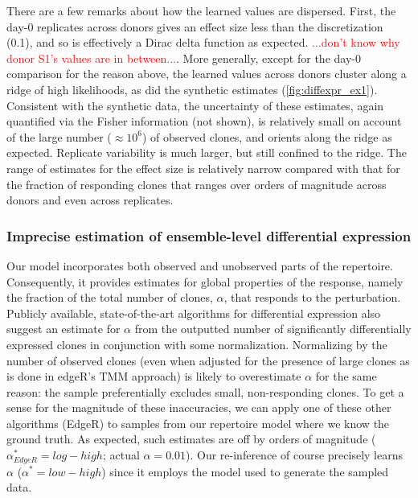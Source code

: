 \documentclass[letterpaper,english,prl,reprint,longbibliography]{revtex4-1} %
\newcommand{\re}[1]{\textcolor{red}{#1}}
\begin{document}
There are a few remarks about how the learned values are dispersed. First, the day-0 replicates across donors gives an effect size less than the discretization (0.1), and so is effectively a Dirac delta function as expected. \re{...don't know why donor S1's values are in between...}. More generally, except for the day-0 comparison for the reason above, the learned values across donors cluster along a ridge of high likelihoods, as did the synthetic estimates (\cref{fig:diffexpr_ex1}). Consistent with the synthetic data, the uncertainty of these estimates, again quantified via the Fisher information (not shown), is relatively small on account of the large number ($\approx 10^6$) of observed clones, and orients along the ridge as expected. Replicate variability is much larger, but still confined to the ridge. The range of estimates for the effect size is relatively narrow compared with that for the fraction of responding clones that ranges over orders of magnitude across donors and even across replicates.

\subsubsection*{Imprecise estimation of ensemble-level differential expression}
Our model incorporates both observed and unobserved parts of the repertoire. Consequently, it provides estimates for global properties of the response, namely the fraction of the total number of clones, $\alpha$, that responds to the perturbation. Publicly available, state-of-the-art algorithms for differential expression also suggest an estimate for $\alpha$ from the outputted number of significantly differentially expressed clones in conjunction with some normalization. 
Normalizing by the number of observed clones (even when adjusted for the presence of large clones as is done in edgeR's TMM approach) is likely to overestimate $\alpha$ for the same reason: the sample preferentially excludes small, non-responding clones.
% 
To get a sense for the magnitude of these inaccuracies, we can apply one of these other algorithms (EdgeR) to samples from our repertoire model where we know the ground truth. As expected, such estimates are off by orders of magnitude ($\alpha^*_{EdgeR}=log-high$; actual $\alpha=0.01$). Our re-inference of course precisely learns $\alpha$ ($\alpha^*=low-high$) since it employs the model used to generate the sampled data. 
\end{document}
